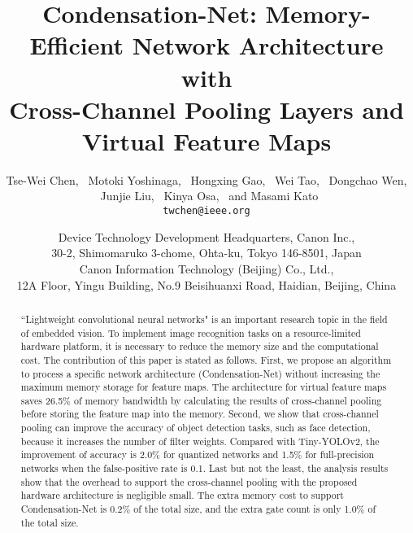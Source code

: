 \documentclass[10pt,twocolumn,letterpaper]{article}
\begin{document}
\title{Condensation-Net: Memory-Efficient Network Architecture with\\ Cross-Channel Pooling Layers and Virtual Feature Maps}
\author{Tse-Wei Chen,
~Motoki Yoshinaga,
~Hongxing Gao,
~Wei Tao,
~Dongchao Wen,\\
~Junjie Liu,
~Kinya Osa,
~and Masami Kato\\
{\tt\small twchen@ieee.org}\\
\and
Device Technology Development Headquarters, Canon Inc.,\\
30-2, Shimomaruko 3-chome, Ohta-ku, Tokyo 146-8501, Japan\\
Canon Information Technology (Beijing) Co., Ltd.,\\
12A Floor, Yingu Building, No.9 Beisihuanxi Road, Haidian, Beijing, China\\
}



\maketitle
\thispagestyle{empty}

\begin{abstract}
``Lightweight convolutional neural networks" is an important research topic in the field of embedded vision. To implement image recognition tasks on a resource-limited hardware platform, it is necessary to reduce the memory size and the computational cost. The contribution of this paper is stated as follows. First, we propose an algorithm to process a specific network architecture (Condensation-Net) without increasing the maximum memory storage for feature maps. The architecture for virtual feature maps saves 26.5\% of memory bandwidth by calculating the results of cross-channel pooling before storing the feature map into the memory. Second, we show that cross-channel pooling can improve the accuracy of object detection tasks, such as face detection, because it increases the number of filter weights. Compared with Tiny-YOLOv2, the improvement of accuracy is 2.0\% for quantized networks and 1.5\% for full-precision networks when the false-positive rate is 0.1. Last but not the least, the analysis results show that the overhead to support the cross-channel pooling with the proposed hardware architecture is negligible small. The extra memory cost to support Condensation-Net is 0.2\% of the total size, and the extra gate count is only 1.0\% of the total size.



\end{abstract}
\end{document}
